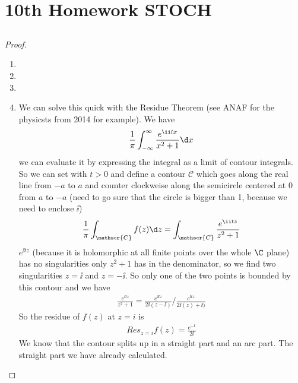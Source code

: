 
\section{10th Homework STOCH}
\subsection{}
\begin{proof}
	\begin{enumerate}
		\item 
		\item 
		\item 
		\item We can solve this quick with the Residue Theorem (see ANAF for the physicsts from 2014 for example). We have
		\begin{align*}
		\frac{1}{\pi}\int_{-\infty}^{\infty} \frac{e^{\ii t x}}{x^2+1} \d x
		\end{align*}
		we can evaluate it by expressing the integral as a limit of contour integrals. So we can set with $t>0$ and define a contour $\mathscr{C}$ which goes along the real line from $-a$ to $a$ and counter clockweise along the semicircle centered at 0 from $a$ to $-a$ (need to go sure that the circle is bigger than 1, because we need to enclose $\ii$)
		\begin{align*}
		\frac{1}{\pi}\int_{\mathscr{C}} f(z) \d z = \int_{\mathscr{C}} \frac{e^{\ii t z}}{z^2+1}
		\end{align*}
		$e^{\ii t z}$ (because it is holomorphic at all finite points over the whole $\C$ plane) has no singularities only $z^2+1$ has in the denominator, so we find two singularities $z=\ii$ and $z = - \ii$. So only one of the two points is bounded by this contour and we have
		\begin{align*}
		\frac{e^{\ii t z}}{z^2+1} = \frac{e^{\ii t z}}{2 \ii (z- \ii)} / \frac{e^{\ii t z}}{2 \ii (z)+ \ii)}
		\end{align*}
		So the residue of $f(z)$ at $z = i$ is
		\begin{align*}
		Res_{z=i} f(z) = \frac{e^{-t}}{2 \ii}
		\end{align*}
		We know that the contour splits up in a straight part and an arc part. The straight part we have already calculated. %
	\end{enumerate}	
\end{proof}

